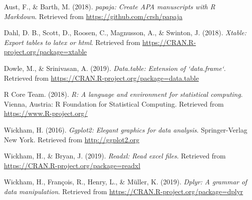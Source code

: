 \documentclass[man]{apa6}
\begin{document}
\begingroup
\setlength{\parindent}{-0.5in} \setlength{\leftskip}{0.5in}

\hypertarget{refs}{}
\hypertarget{ref-R-papaja}{}
Aust, F., \& Barth, M. (2018). \emph{papaja: Create APA manuscripts with
R Markdown}. Retrieved from \url{https://github.com/crsh/papaja}

\hypertarget{ref-R-xtable}{}
Dahl, D. B., Scott, D., Roosen, C., Magnusson, A., \& Swinton, J.
(2018). \emph{Xtable: Export tables to latex or html}. Retrieved from
\url{https://CRAN.R-project.org/package=xtable}

\hypertarget{ref-R-data.table}{}
Dowle, M., \& Srinivasan, A. (2019). \emph{Data.table: Extension of
`data.frame`}. Retrieved from
\url{https://CRAN.R-project.org/package=data.table}

\hypertarget{ref-R-base}{}
R Core Team. (2018). \emph{R: A language and environment for statistical
computing}. Vienna, Austria: R Foundation for Statistical Computing.
Retrieved from \url{https://www.R-project.org/}

\hypertarget{ref-R-ggplot2}{}
Wickham, H. (2016). \emph{Ggplot2: Elegant graphics for data analysis}.
Springer-Verlag New York. Retrieved from \url{http://ggplot2.org}

\hypertarget{ref-R-readxl}{}
Wickham, H., \& Bryan, J. (2019). \emph{Readxl: Read excel files}.
Retrieved from \url{https://CRAN.R-project.org/package=readxl}

\hypertarget{ref-R-dplyr}{}
Wickham, H., François, R., Henry, L., \& Müller, K. (2019). \emph{Dplyr:
A grammar of data manipulation}. Retrieved from
\url{https://CRAN.R-project.org/package=dplyr}

\endgroup
\end{document}
